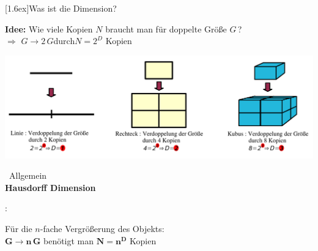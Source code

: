 \documentclass[final]{beamer}
\newlength{\columnheight}
\newlength{\marginw}
\newlength{\tw}
\newlength{\colsep}
\newlength{\colw}
\newenvironment{myTwoColPoster}{%
  \begin{minipage}[t]{\textwidth}%
    \hspace*{\marginw}%
    \hspace*{9.5bp}%
    \begin{minipage}[t]{\tw}}%
  {\end{minipage}%
   \hspace*{\marginw}%
   \end{minipage}}
\newenvironment{myCol}%
    {\begin{minipage}[t][\columnheight][t]{\colw}}%
    {\end{minipage}}
\newenvironment{textblock}[1]%
    {\begin{block}{\rule[-0.6ex]{0pt}{2.4ex}\raisebox{-0.25ex}[1.6ex]{#1}}%
     \vspace*{5mm}}%
    {\vspace*{5mm}\end{block}}
\begin{document}
\begin{frame}[t]{}
\begin{myTwoColPoster}
\begin{myCol}
\begin{textblock}{Was ist die Dimension?}
    \begin{center}
      \textbf{  \textcolor{IPForange}{Idee:} }Wie viele Kopien $N$ braucht man f\"ur doppelte Gr\"o\ss e $G\,$?\\
      $\Rightarrow$ $G\to2\,G$\hspace*{1.5cm}durch\hspace*{1.5cm}$N=2^D$ Kopien
    \end{center}

    \includegraphics[width=1.01\textwidth]{fig/natD}\\[1.5cm]

    \begin{minipage}[c]{0.4\textwidth}\
      \textcolor{IPForange}{Allgemein} \\
      \textcolor{IPForange}{\textbf{Hausdorff Dimension}} 
    \end{minipage}\hfill
    \begin{minipage}[c]{0.01\textwidth}
      {\Huge :}
    \end{minipage}\hfill
    \begin{minipage}[c]{0.58\textwidth}
      \begin{center}
        F\"ur die $n$-fache Vergr\"o\ss erung des Objekts:\\
        $\boldsymbol{G\to n\,G}$ ben\"otigt man $\boldsymbol{N=n^D}$ Kopien
      \end{center}
    \end{minipage}


  \end{textblock}

  

\end{myCol}
\hfill
\begin{myCol}
  


\end{myCol}
\end{myTwoColPoster}
\end{frame}
\end{document}
